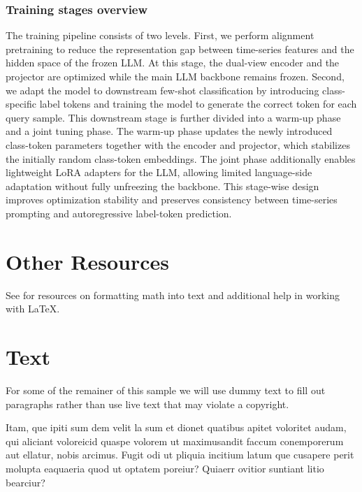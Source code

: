 \documentclass[lettersize,journal]{IEEEtran}
\begin{document}
\subsubsection{Training stages overview}
The training pipeline consists of two levels. 
First, we perform alignment pretraining to reduce the representation gap between time-series features and the hidden space of the frozen LLM. 
At this stage, the dual-view encoder and the projector are optimized while the main LLM backbone remains frozen. 
Second, we adapt the model to downstream few-shot classification by introducing class-specific label tokens and training the model to generate the correct token for each query sample. 
This downstream stage is further divided into a warm-up phase and a joint tuning phase. 
The warm-up phase updates the newly introduced class-token parameters together with the encoder and projector, which stabilizes the initially random class-token embeddings. 
The joint phase additionally enables lightweight LoRA adapters for the LLM, allowing limited language-side adaptation without fully unfreezing the backbone. 
This stage-wise design improves optimization stability and preserves consistency between time-series prompting and autoregressive label-token prediction.

\section{Other Resources}
See \cite{ref1,ref2,ref3,ref4,ref5} for resources on formatting math into text and additional help in working with \LaTeX .

\section{Text}
For some of the remainer of this sample we will use dummy text to fill out paragraphs rather than use live text that may violate a copyright.

Itam, que ipiti sum dem velit la sum et dionet quatibus apitet voloritet audam, qui aliciant voloreicid quaspe volorem ut maximusandit faccum conemporerum aut ellatur, nobis arcimus.
Fugit odi ut pliquia incitium latum que cusapere perit molupta eaquaeria quod ut optatem poreiur? Quiaerr ovitior suntiant litio bearciur?
\end{document}
